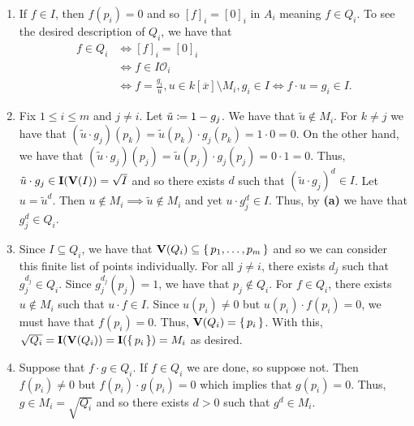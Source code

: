 \documentclass[letterpaper, 11pt, oneside]{book}
\begin{document}
\begin{sol}\label{ex:UAG_4.2.11}
  \begin{enumerate}
    \item If $f \in I$, then $f(p_{i}) = 0$ and so $[f]_{i} = [0]_{i}$ in $A_{i}$ meaning $f \in Q_{i}$.
          To see the desired description of $Q_{i}$, we have that
          \begin{align*}
            f \in Q_{i} &\iff [f]_{i} = [0]_{i} \\
                        &\iff f \in I \mathcal{O}_{i} \\
                        &\iff f = \frac{g_{i}}{u}, u \in k[\overline{x}] \setminus M_{i}, g_{i} \in I \iff f \cdot u = g_{i} \in I.
          \end{align*}
    \item Fix $1 \leq i \leq m$ and $j \neq i$.
          Let $\tilde{u} \coloneqq 1 - g_{j}$.
          We have that $\tilde{u} \notin M_{i}$.
          For $k \neq j$ we have that $(\tilde{u} \cdot g_{j})(p_{k}) = \tilde{u}(p_{k}) \cdot g_{j}(p_{k}) = 1 \cdot 0 = 0$.
          On the other hand, we have that $(\tilde{u} \cdot g_{j})(p_{j}) = \tilde{u}(p_{j}) \cdot g_{j}(p_{j}) = 0 \cdot 1 = 0$.
          Thus, $\tilde{u} \cdot g_{j} \in \operatorname{\mathbf{I}}(\operatorname{\mathbf{V}}(I)) = \sqrt{I}$ and so there exists $d$ such that $(\tilde{u} \cdot g_{j})^{d} \in I$.
          Let $u = \tilde{u}^{d}$.
          Then $u \notin M_{i} \implies \tilde{u} \notin M_{i}$ and yet $u \cdot g_{j}^{d} \in I$.
          Thus, by \textbf{(a)} we have that $g_{j}^{d} \in Q_{i}$.
    \item Since $I \subseteq Q_{i}$, we have that $\operatorname{\mathbf{V}}(Q_{i}) \subseteq \set{p_{1}, \ldots, p_{m}}$ and so we can consider this finite list of points individually.
          For all $j \neq i$, there exists $d_{j}$ such that $g_{j}^{d_{j}} \in Q_{i}$.
          Since $g_{j}^{d_{j}}(p_{j}) = 1$, we have that $p_{j} \notin Q_{i}$.
          For $f \in Q_{i}$, there exists $u \notin M_{i}$ such that $u \cdot f \in I$.
          Since $u(p_{i}) \neq 0$ but $u(p_{i}) \cdot f(p_{i}) = 0$, we must have that $f(p_{i}) = 0$.
          Thus, $\operatorname{\mathbf{V}}(Q_{i}) = \set{p_{i}}$.
          With this, $\sqrt{Q_{i}} = \operatorname{\mathbf{I}}(\operatorname{\mathbf{V}}(Q_{i})) = \operatorname{\mathbf{I}}(\set{p_{i}}) = M_{i}$ as desired.
    \item Suppose that $f \cdot g \in Q_{i}$.
          If $f \in Q_{i}$ we are done, so suppose not.
          Then $f(p_{i}) \neq 0$ but $f(p_{i}) \cdot g(p_{i}) = 0$ which implies that $g(p_{i}) = 0$.
          Thus, $g \in M_{i} = \sqrt{Q_{i}}$ and so there exists $d > 0$ such that $g^{d} \in M_{i}$.

\end{enumerate}
\end{sol}
\end{document}

